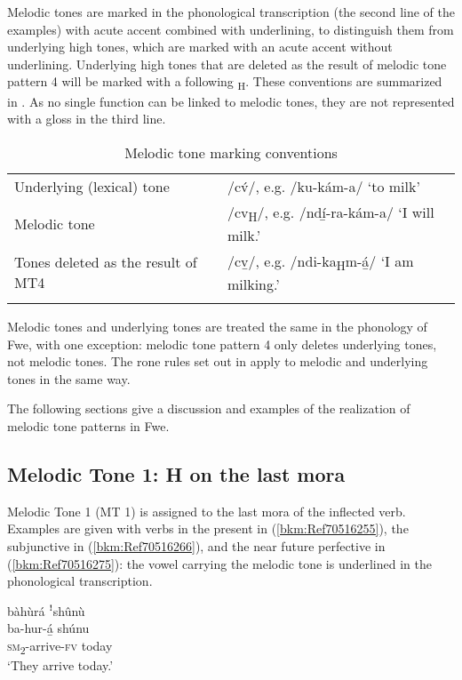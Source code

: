 Melodic tones are marked in the phonological transcription (the second line of the examples) with acute accent combined with underlining, to distinguish them from underlying high tones, which are marked with an acute accent without underlining. Underlying high tones that are deleted as the result of melodic tone pattern 4 will be marked with a following \textsubscript{H}. These conventions are summarized in . As no single function can be linked to melodic tones, they are not represented with a gloss in the third line.

\begin{table}
\label{bkm:Ref507424979}\caption{\label{tab:3:6}Melodic tone marking conventions}

\begin{tabularx}{\textwidth}{XX}

\lsptoprule

Underlying (lexical) tone & /c\'{v}/, e.g. /ku-kám-a/ ‘to milk’\\
Melodic tone & /cv\textsubscript{H}/, e.g. /ndí̲-ra-kám-a/ ‘I will milk.’\\
Tones deleted as the result of MT4 & /cv̲/, e.g. /ndi-ka\textsubscript{H}m-á̲/ ‘I am milking.’\\
\lspbottomrule
\end{tabularx}
\end{table}

Melodic tones and underlying tones are treated the same in the phonology of Fwe, with one exception: melodic tone pattern 4 only deletes underlying tones, not melodic tones. The rone rules set out in  apply to melodic and underlying tones in the same way.

The following sections give a discussion and examples of the realization of melodic tone patterns in Fwe.

\subsection{Melodic Tone 1: H on the last mora}
\label{bkm:Ref71540310}\hypertarget{Toc75352629}{}\label{bkm:Ref71540433}
Melodic Tone 1 (MT 1) is assigned to the last mora of the inflected verb. Examples are given with verbs in the present in (\ref{bkm:Ref70516255}), the subjunctive in (\ref{bkm:Ref70516266}), and the near future perfective in (\ref{bkm:Ref70516275}): the vowel carrying the melodic tone is underlined in the phonological transcription.

\ea
\label{bkm:Ref70516255}
bàhùrá ꜝshûnù\\
\gll ba-hur-á̲    shúnu\\
\textsc{sm}\textsubscript{2}-arrive-\textsc{fv}  today\\
\glt ‘They arrive today.’
\z

